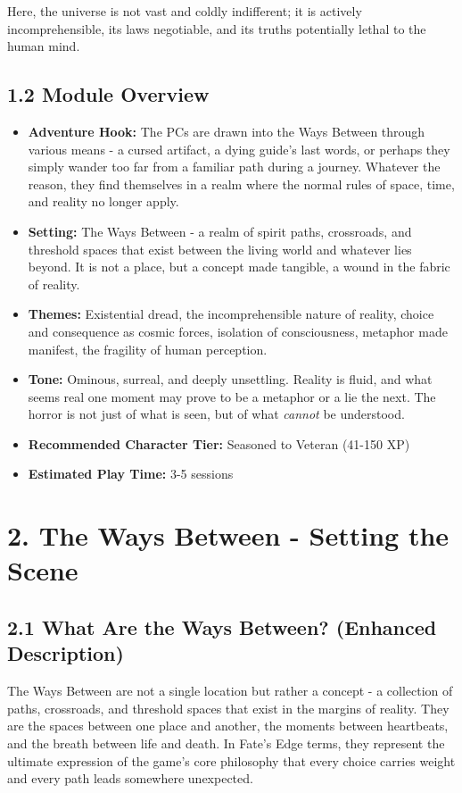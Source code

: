\documentclass[11pt]{article}
\begin{document}
Here, the universe is not vast and coldly indifferent; it is actively incomprehensible, its laws negotiable, and its truths potentially lethal to the human mind.

\subsection*{1.2 Module Overview}

\begin{itemize}
\item \textbf{Adventure Hook:} The PCs are drawn into the Ways Between through various means - a cursed artifact, a dying guide's last words, or perhaps they simply wander too far from a familiar path during a journey. Whatever the reason, they find themselves in a realm where the normal rules of space, time, and reality no longer apply.
\item \textbf{Setting:} The Ways Between - a realm of spirit paths, crossroads, and threshold spaces that exist between the living world and whatever lies beyond. It is not a place, but a concept made tangible, a wound in the fabric of reality.
\item \textbf{Themes:} Existential dread, the incomprehensible nature of reality, choice and consequence as cosmic forces, isolation of consciousness, metaphor made manifest, the fragility of human perception.
\item \textbf{Tone:} Ominous, surreal, and deeply unsettling. Reality is fluid, and what seems real one moment may prove to be a metaphor or a lie the next. The horror is not just of what is seen, but of what \textit{cannot} be understood.
\item \textbf{Recommended Character Tier:} Seasoned to Veteran (41-150 XP)
\item \textbf{Estimated Play Time:} 3-5 sessions
\end{itemize}

\clearpage

\section*{2. The Ways Between - Setting the Scene}

\subsection*{2.1 What Are the Ways Between? (Enhanced Description)}

The Ways Between are not a single location but rather a concept - a collection of paths, crossroads, and threshold spaces that exist in the margins of reality. They are the spaces between one place and another, the moments between heartbeats, and the breath between life and death. In Fate's Edge terms, they represent the ultimate expression of the game's core philosophy that every choice carries weight and every path leads somewhere unexpected.
\end{document}
